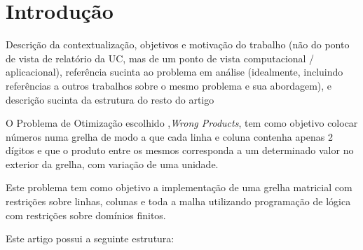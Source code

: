 \documentclass[11pt]{article}
\begin{document}
\section{Introdução} Descrição da contextualização, objetivos e motivação do
trabalho (não do ponto de vista de relatório da UC, mas de um ponto de vista
computacional / aplicacional), referência sucinta ao problema em análise (idealmente,
incluindo referências a outros trabalhos sobre o mesmo problema e sua abordagem), e
descrição sucinta da estrutura do resto do artigo

O Problema de Otimização escolhido ,\emph{Wrong Products}, tem como objetivo colocar números numa grelha de modo a que cada linha e coluna contenha apenas 2 dígitos e que o produto entre os mesmos corresponda a um determinado valor no exterior da grelha, com variação de uma unidade.

Este problema tem como objetivo a implementação de uma grelha matricial com restrições sobre linhas, colunas e toda a malha utilizando programação de lógica com restrições sobre domínios finitos.

\bigskip

Este artigo possui a seguinte estrutura:
\end{document}
